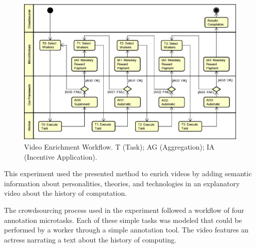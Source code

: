 \begin{figure}[ht]
	\centerline{\includegraphics[scale=0.35] {figure/case}}
	\caption{Video Enrichment Workflow. T (Task); AG (Aggregation); IA (Incentive Application).}
	\label{workflow}
\end{figure}

This experiment used the presented method to enrich videos by adding semantic information about personalities, theories, and technologies in an explanatory video about the history of computation. 



The crowdsourcing process used in the experiment followed a workflow of four annotation microtasks. Each of these simple tasks was modeled that could be performed by a worker through a simple annotation tool. The video features an actress narrating a text about the history of computing.


